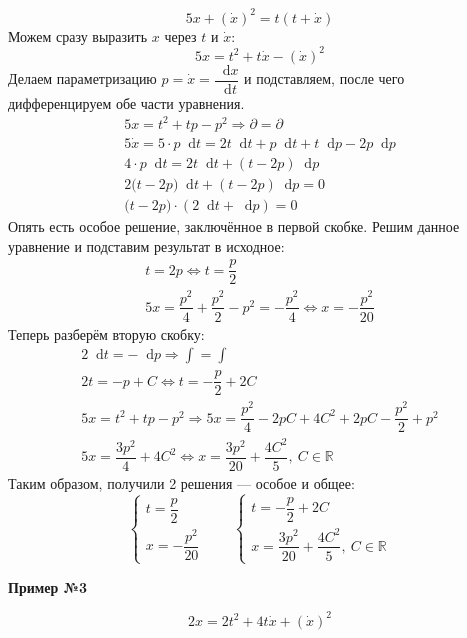 \documentclass[a4paper,12pt]{article}
\newcommand{\R}{\mathbb{R}}
\renewcommand*\d{\mathop{}\!\mathrm{d}}
\newcommand{\dx}{\dot{x}}
\newcommand{\bto}{\Longrightarrow}
\newcommand{\ds}{\displaystyle}
\begin{document}
\[5x + (\dx)^2 = t(t + \dx)\]
Можем сразу выразить $x$ через $t$ и $\dx$:
\[5x = t^2 + t\dx - (\dx)^2\]
Делаем параметризацию $p = \dx = \dfrac{\d x}{\d t}$ и подставляем, после чего дифференцируем обе части уравнения.
\begin{gather*}
	5x = t^2 + tp - p^2 \bto \partial = \partial\\
	5\dx = 5\cdot p\d t = 2t\d t + p\d t + t\d p - 2p\d p\\
	4\cdot p\d t = 2t\d t + (t - 2p)\d p\\
	2\big(t - 2p\big)\d t + (t - 2p)\d p = 0\\
	\big(t - 2p\big) \cdot (2\d t + \d p) = 0
\end{gather*}
Опять есть особое решение, заключённое в первой скобке. Решим данное уравнение и подставим результат в исходное:
\begin{gather*}
	t = 2p \iff t = \dfrac{p}{2}\\
	5x = \dfrac{p^2}{4} + \dfrac{p^2}{2} - p^2 = - \dfrac{p^2}{4} \iff x = -\dfrac{p^2}{20}
\end{gather*}
Теперь разберём вторую скобку:
\begin{gather*}
	2\d t = -\d p \bto \ds\int = \int\\
	2t = -p + C \iff t = -\dfrac{p}{2} + 2C\\
	5x = t^2 + tp - p^2 \bto 5x = \dfrac{p^2}{4} - 2pC + 4C^2 + 2pC - \dfrac{p^2}{2} + p^2\\
	5x = \dfrac{3p^2}{4} + 4C^2 \iff x = \dfrac{3p^2}{20} + \dfrac{4C^2}{5},\ C \in \R
\end{gather*}
Таким образом, получили 2 решения --- особое и общее:
\[\begin{cases}
	t = \dfrac{p}{2}\\
	x = -\dfrac{p^2}{20}
\end{cases} \qquad \begin{cases}
	t = -\dfrac{p}{2} + 2C\\
	x = \dfrac{3p^2}{20} + \dfrac{4C^2}{5},\ C \in \R
\end{cases}\]

\textbf{Пример №3}

\[2x = 2t^2 + 4t\dx + (\dx)^2\]
\end{document}
